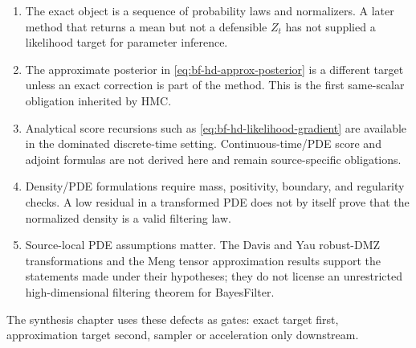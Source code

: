 \begin{enumerate}[label=(\arabic*)]
  \item The exact object is a sequence of probability laws and normalizers.
  A later method that returns a mean but not a defensible \(Z_t\) has not
  supplied a likelihood target for parameter inference.
  \item The approximate posterior in \eqref{eq:bf-hd-approx-posterior} is a
  different target unless an exact correction is part of the method.  This is
  the first same-scalar obligation inherited by HMC.
  \item Analytical score recursions such as
  \eqref{eq:bf-hd-likelihood-gradient} are available in the dominated
  discrete-time setting.  Continuous-time/PDE score and adjoint formulas are
  not derived here and remain source-specific obligations.
  \item Density/PDE formulations require mass, positivity, boundary, and
  regularity checks.  A low residual in a transformed PDE does not by itself
  prove that the normalized density is a valid filtering law.
  \item Source-local PDE assumptions matter.  The Davis and Yau robust-DMZ
  transformations and the Meng tensor approximation results support the
  statements made under their hypotheses; they do not license an unrestricted
  high-dimensional filtering theorem for BayesFilter.
\end{enumerate}

The synthesis chapter uses these defects as gates: exact target first,
approximation target second, sampler or acceleration only downstream.

